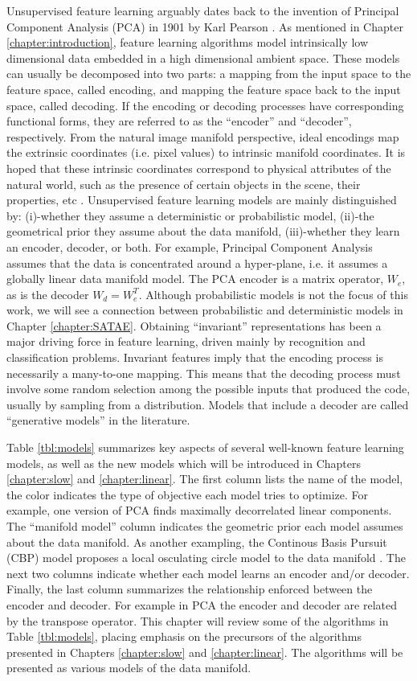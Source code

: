 Unsupervised feature learning arguably dates back to the invention of Principal
Component Analysis (PCA) in 1901 by Karl Pearson \cite{PCA}. As mentioned in
Chapter \ref{chapter:introduction}, feature learning algorithms model
intrinsically low dimensional data embedded in a high dimensional ambient
space. These models can usually be decomposed into two parts: a mapping from
the input space to the feature space, called encoding, and mapping the feature
space back to the input space, called decoding. If the encoding or decoding
processes have corresponding functional forms, they are referred to as the
``encoder'' and ``decoder'', respectively.  From the natural image manifold
perspective, ideal encodings map the extrinsic coordinates (i.e. pixel values)
to intrinsic manifold coordinates. It is hoped that these intrinsic coordinates
correspond to physical attributes of the natural world, such as the presence of
certain objects in the scene, their properties, etc \cite{nair2008,capsules}.
Unsupervised feature learning models are mainly distinguished by: (i)-whether
they assume a deterministic or probabilistic model, (ii)-the geometrical prior
they assume about the data manifold, (iii)-whether they learn an encoder,
decoder, or both. For example, Principal Component Analysis assumes that the
data is concentrated around a hyper-plane, i.e. it assumes a globally linear
data manifold model. The PCA encoder is a matrix operator, $W_e$, as is the
decoder $W_d=W_e^T$. Although probabilistic models is not the focus of this
work, we will see a connection between probabilistic and deterministic models
in Chapter \ref{chapter:SATAE}.  Obtaining ``invariant'' representations has
been a major driving force in feature learning, driven mainly by recognition
and classification problems.  Invariant features imply that the encoding
process is necessarily a many-to-one mapping. This means that the decoding
process must involve some random selection among the possible inputs that
produced the code, usually  by sampling from a distribution. Models that
include a decoder are called ``generative models'' in the literature. 

Table \ref{tbl:models} summarizes key aspects of several well-known feature
learning models, as well as the new models which will be introduced in Chapters
\ref{chapter:slow} and \ref{chapter:linear}. The first column lists the name of
the model, the color indicates the type of objective each model tries to
optimize. For example, one version of PCA finds maximally decorrelated linear
components. The ``manifold model'' column indicates the geometric prior each
model assumes about the data manifold. As another exampling,  the Continous
Basis Pursuit (CBP) model proposes a local osculating circle model to the data
manifold \cite{CBP}.  The next two columns indicate whether each model learns
an encoder and/or decoder.  Finally, the last column summarizes the
relationship enforced between the encoder and decoder. For example in PCA the
encoder and decoder are related by the transpose operator. This chapter will
review some of the algorithms in Table \ref{tbl:models}, placing emphasis on
the precursors of the algorithms presented in Chapters \ref{chapter:slow} and
\ref{chapter:linear}. The algorithms will be presented as various models of the
data manifold.

